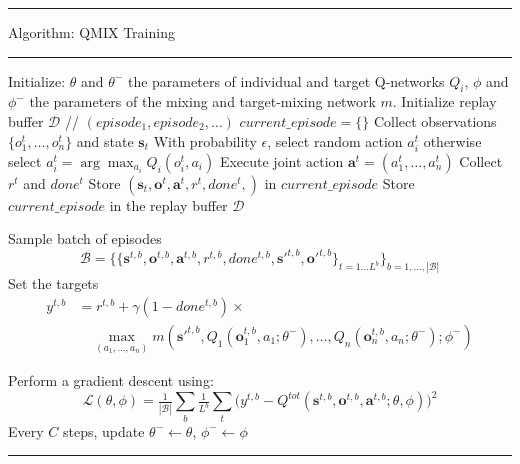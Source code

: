 \documentclass[varwidth, border=20pt]{standalone}
\begin{document}
\begingroup
\small                    
\begin{center}
  \begin{minipage}{0.99\linewidth} 
    \hrule height 0.7pt
    \vspace{3pt}
    Algorithm: QMIX Training
    \vspace{3pt}
    \hrule height 0.7pt
    \vspace{6pt}

   
    \begin{algorithmic}[1]
      \State Initialize: $\theta$ and  $\theta^-$ the parameters of individual and target Q-networks $Q_i$, $\phi$ and $\phi^-$ the parameters of the mixing and target-mixing network $m$.
      \State Initialize replay buffer $\mathcal{D}$ // $(episode_1, episode_2, \dots)$
        \State $current\_episode = \{ \}$ 
        \State Collect observations $\{o^t_1,\dots,o^t_n\}$ and state $\mathbf{s}_t$
              \State With probability $\epsilon$, select random action $a_i^t$
              \State otherwise select $a_i^t = \arg\max_{a_i} Q_i(o^t_i,a_i)$
         \EndFor
         \State Execute joint action $\mathbf{a}^t = (a_1^t,\dots,a_n^t)$
         \State Collect $r^t$ and  $done^t$
         \State Store $(\mathbf{s}_t,\mathbf{o}^t,\mathbf{a}^t,r^t,done^t,)$ in $current\_episode$
        \EndWhile
        \State Store $current\_episode$ in the replay buffer $\mathcal{D}$
        
          \State Sample batch of episodes 
          \[ 
            \mathcal{B} = \{ \{\mathbf{s}^{t,b},\mathbf{o}^{t,b},\mathbf{a}^{t,b},r^{t,b},done^{t,b},\mathbf{s'}^{t,b},\mathbf{o'}^{t,b}\}_{t=1 ... L^b}\}_{b=1, ..., |\mathcal{B}|}\]
          \State Set the targets
          \Statex
          \begin{align*}
            y^{t,b} &= r^{t,b} + \gamma (1 - done^{t,b}) \times \\
            &\quad \max_{(a_1, \dots, a_n)} m(\mathbf{s'}^{t,b}, Q_1(\mathbf{o}_1^{t,b}, a_1;\theta^-), \dots, Q_n(\mathbf{o}_n^{t,b}, a_n;\theta^-); \phi^-)
            \end{align*}
            
          \State Perform a gradient descent using:
          \Statex
          \[
            \mathcal{L}(\theta,\phi)=\tfrac{1}{|\mathcal{B}|}\sum_b \tfrac{1}{L^b} \sum_t \Big(y^{t,b}- Q^{tot}(\mathbf{s}^{t,b},\mathbf{o}^{t,b},\mathbf{a}^{t,b};\theta, \phi)\Big)^2
          \]
          \State Every $C$ steps, update $\theta^- \leftarrow \theta$, $\phi^- \leftarrow \phi$ 
        \EndIf
      \EndWhile
    \end{algorithmic}

    \vspace{6pt}
    \hrule height 0.7pt
  \end{minipage}
\end{center}
\endgroup
\end{document}
